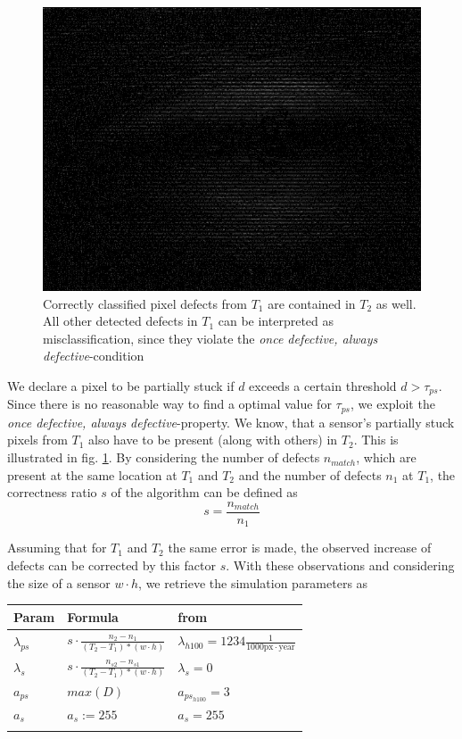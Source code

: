 \documentclass[10pt,twocolumn,letterpaper]{article}
\begin{document}
\begin{figure}
\centering
\includegraphics[width=\linewidth]{img/correlated.png}
\caption{Correctly classified pixel defects from $T_1$ are contained in $T_2$ as well. All other detected defects in $T_1$ can be interpreted as misclassification, since they violate the \emph{once defective, always defective}-condition}
\label{fig:defectPersistence}
\end{figure}
We declare a pixel to be partially stuck if $d$ exceeds a certain threshold $d > \tau_{ps}$. Since there is no reasonable way to find a optimal value for $\tau_{ps}$, we exploit the \emph{once defective, always defective}-property. We know, that a sensor's partially stuck pixels from $T_1$ also have to be present (along with others) in $T_2$. This is illustrated in fig. \ref{fig:defectPersistence}. By considering the number of defects $n_{match}$, which are present at the same location at $T_1$ and $T_2$ and the number of defects $n_1$ at $T_1$, the correctness ratio $s$ of the algorithm can be defined as
\begin{equation}
s = \frac{n_{match}}{n_1}
\end{equation}



Assuming that for $T_1$ and $T_2$ the same error is made, the observed increase of defects can be corrected by this factor $s$. With these observations and considering the size of a sensor $w\cdot h$, we retrieve the simulation parameters as \\

\begin{tabular}{l l l }
Param & Formula & from \cite{agedIris} \\
\hline 
$\lambda_{ps}$ & $s \cdot \frac{n_2-n_1}{(T_2-T_1)*(w \cdot h)}$ & $\lambda_{h100}=\num{1234}\frac{1}{1000 \text{px} \cdot \text{year}}$ \\ 
$\lambda_{s}$ & $s \cdot \frac{n_{s2}-n_{s1}}{(T_2-T_1)*(w \cdot h)}$ & $\lambda_{s} = 0$ \\
$ a_{ps}$ & $max(D)$ & $a_{ps_{h100}} = 3$ \\
$ a_{s}$ & $a_s := 255$ & $a_{s} = 255$ \\
\label{tab:parameters}
\end{tabular}
\end{document}
